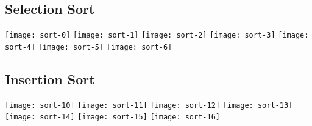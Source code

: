 \documentclass{article}
\begin{document}
\subsection{Selection Sort}
\texttt{[image: sort-0]}
\texttt{[image: sort-1]}
\texttt{[image: sort-2]}
\texttt{[image: sort-3]}
\texttt{[image: sort-4]}
\texttt{[image: sort-5]}
\texttt{[image: sort-6]}

\subsection{Insertion Sort}
\texttt{[image: sort-10]}
\texttt{[image: sort-11]}
\texttt{[image: sort-12]}
\texttt{[image: sort-13]}
\texttt{[image: sort-14]}
\texttt{[image: sort-15]}
\texttt{[image: sort-16]}


\end{document}
